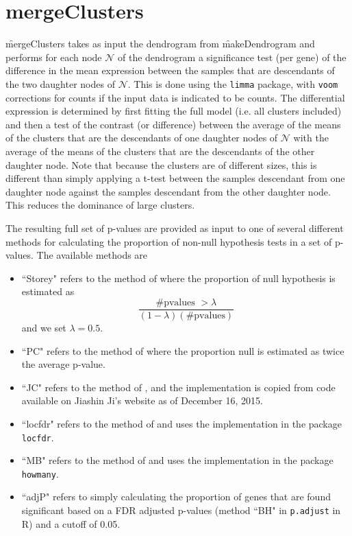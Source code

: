 \section{mergeClusters}

\f{mergeClusters} takes as input the dendrogram from \f{makeDendrogram} and performs for each node $\mathcal{N}$ of the dendrogram a significance test (per gene) of the difference in the mean expression between the samples that are descendants of the two daughter nodes of $\mathcal{N}$. This is done using the \texttt{limma} package, with \texttt{voom} corrections for counts if the input data is indicated to be counts. The differential expression is determined by first fitting the full model (i.e. all clusters included) and then a test of the contrast (or difference) between the average of the means of the clusters that are the descendants of one daughter nodes of $\mathcal{N}$ with the average of the means of the clusters that are the descendants of the other daughter node. Note that because the clusters are of different sizes, this is different than simply applying a t-test between the samples descendant from one daughter node against the samples descendant from the other daughter node. This reduces the dominance of large clusters. 

The resulting full set of p-values are provided as input to one of several different methods for calculating the proportion of non-null hypothesis tests in a set of p-values. The available methods are 

\begin{itemize}
		\item ``Storey" refers to the method of \cite{Storey:2002p3799} where the proportion of null hypothesis is estimated as 
		$$\frac{\text{\# pvalues }>\lambda}{(1-\lambda)(\text{\# pvalues})}$$
and we set $\lambda=0.5$.		
		\item ``PC" refers to the method of \cite{Pounds:2004fd} where the proportion null is estimated as twice the average p-value.
\item ``JC" refers to the method of  \cite{Jin:2007dt}, and the implementation 
is copied from code available on Jiashin Ji's website \cite{jcFunction} as of December 16, 2015. 
\item ``locfdr" refers to the method of \cite{Efron:2004p3807} and uses the implementation in the package
   \texttt{locfdr}. 
\item ``MB" refers to the method of \cite{Meinshausen:2005gp} and uses the implementation in the package \texttt{howmany}. 
\item ``adjP"   refers to simply calculating the proportion of genes that are found significant based on a FDR adjusted p-values (method ``BH" in \texttt{p.adjust} in R) and a cutoff of 0.05.

\end{itemize}



